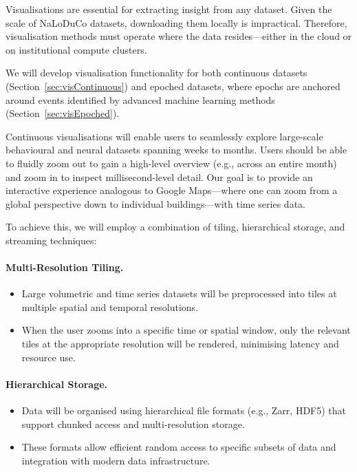 Visualisations are essential for extracting insight from any dataset.
%
Given the scale of NaLoDuCo datasets, downloading them locally is impractical.
Therefore, visualisation methods must operate where the data resides—either in
the cloud or on institutional compute clusters.

We will develop visualisation functionality for both continuous datasets
(Section~\ref{sec:visContinuous}) and epoched datasets, where epochs are
anchored around events identified by advanced machine learning methods
(Section~\ref{sec:visEpoched}).

\label{sec:visContinuous}

Continuous visualisations will enable users to seamlessly explore large-scale
behavioural and neural datasets spanning weeks to months. Users should be able
to fluidly zoom out to gain a high-level overview (e.g., across an entire
month) and zoom in to inspect millisecond-level detail. Our goal is to provide
an interactive experience analogous to Google Maps—where one can zoom from a
global perspective down to individual buildings—with time series data.

To achieve this, we will employ a combination of tiling, hierarchical storage,
and streaming techniques:

\paragraph{Multi-Resolution Tiling.}
\begin{itemize}
          \item Large volumetric and time series datasets will be preprocessed
              into tiles at multiple spatial and temporal resolutions.
                \item When the user zooms into a specific time or spatial
                    window, only the relevant tiles at the appropriate
                    resolution will be rendered, minimising latency and
                    resource use.
\end{itemize}

\paragraph{Hierarchical Storage.}
\begin{itemize}
          \item Data will be organised using hierarchical file formats (e.g.,
              Zarr, HDF5) that support chunked access and multi-resolution
              storage.
                \item These formats allow efficient random access to specific
                    subsets of data and integration with modern data
                    infrastructure.
\end{itemize}

